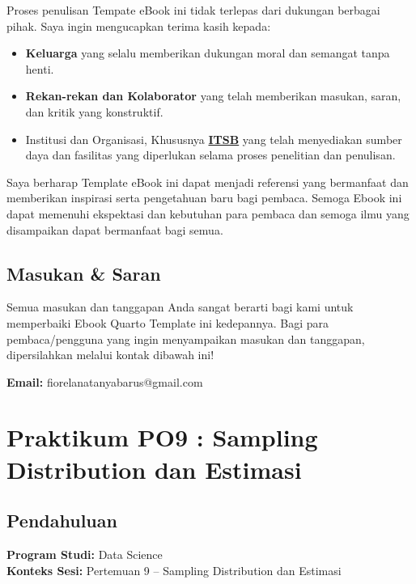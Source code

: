 \documentclass[
  indonesian,
  letterpaper,
]{book}
\providecommand{\tightlist}{%
  \setlength{\itemsep}{0pt}\setlength{\parskip}{0pt}}
\begin{document}

Proses penulisan Tempate eBook ini tidak terlepas dari dukungan berbagai
pihak. Saya ingin mengucapkan terima kasih kepada:

\begin{itemize}
\tightlist
\item
  \textbf{Keluarga} yang selalu memberikan dukungan moral dan semangat
  tanpa henti.
\item
  \textbf{Rekan-rekan dan Kolaborator} yang telah memberikan masukan,
  saran, dan kritik yang konstruktif.
\item
  Institusi dan Organisasi, Khususnya
  \textbf{\href{https://itsb.ac.id/}{ITSB}} yang telah menyediakan
  sumber daya dan fasilitas yang diperlukan selama proses penelitian dan
  penulisan.
\end{itemize}

Saya berharap Template eBook ini dapat menjadi referensi yang bermanfaat
dan memberikan inspirasi serta pengetahuan baru bagi pembaca. Semoga
Ebook ini dapat memenuhi ekspektasi dan kebutuhan para pembaca dan
semoga ilmu yang disampaikan dapat bermanfaat bagi semua.

\section*{Masukan \& Saran}\label{masukan-saran}


Semua masukan dan tanggapan Anda sangat berarti bagi kami untuk
memperbaiki Ebook Quarto Template ini kedepannya. Bagi para
pembaca/pengguna yang ingin menyampaikan masukan dan tanggapan,
dipersilahkan melalui kontak dibawah ini!

\textbf{Email:} fiorelanatanyabarus@gmail.com


\chapter{Praktikum PO9 : Sampling Distribution dan
Estimasi}\label{praktikum-po9-sampling-distribution-dan-estimasi}

\section{Pendahuluan}\label{pendahuluan}

\textbf{Program Studi:} Data Science\\
\textbf{Konteks Sesi:} Pertemuan 9 -- Sampling Distribution dan Estimasi
\end{document}
